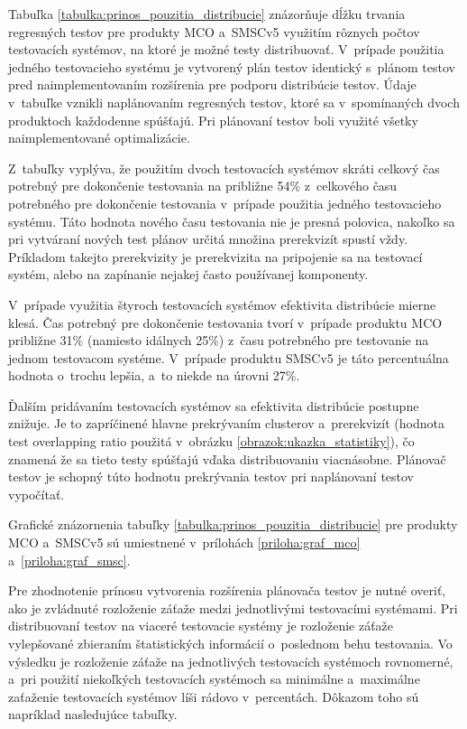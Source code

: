 Tabuľka \ref{tabulka:prinos_pouzitia_distribucie} znázorňuje dĺžku trvania 
regresných testov pre produkty MCO a~SMSCv5 využitím rôznych počtov 
testovacích systémov, na ktoré je možné testy distribuovať. 
V~prípade použitia jedného testovacieho systému
je vytvorený plán testov identický s~plánom testov pred naimplementovaním 
rozšírenia pre podporu distribúcie testov. 
Údaje v~tabuľke vznikli naplánovaním regresných testov, ktoré sa 
v~spomínaných dvoch produktoch každodenne spúšťajú.
Pri plánovaní testov boli využité všetky naimplementované optimalizácie.

Z~tabuľky vyplýva, že použitím dvoch testovacích systémov skráti celkový
čas potrebný pre dokončenie testovania na približne 54\% z~celkového času 
potrebného pre dokončenie testovania v~prípade použitia jedného 
testovacieho systému.
Táto hodnota nového času testovania nie je presná polovica, nakoľko sa pri
vytváraní nových test plánov určitá množina prerekvizít spustí vždy.
Príkladom takejto prerekvizity je prerekvizita na pripojenie sa na testovací
systém, alebo na zapínanie nejakej často používanej komponenty. 

V~prípade využitia štyroch testovacích systémov efektivita distribúcie 
mierne klesá. Čas potrebný pre dokončenie testovania tvorí 
v~prípade produktu MCO približne 31\% (namiesto idálnych 25\%) 
z~času potrebného pre testovanie na jednom testovacom systéme.
V~prípade produktu SMSCv5 je táto percentuálna hodnota o~trochu 
lepšia, a~to niekde na úrovni 27\%.

Ďalším pridávaním testovacích systémov sa efektivita distribúcie 
postupne znižuje. Je to zapríčinené hlavne prekrývaním clusterov 
a~prerekvizít (hodnota test overlapping ratio použitá v~obrázku 
\ref{obrazok:ukazka_statistiky}), čo znamená že sa tieto testy spúšťajú 
vďaka distribuovaniu viacnásobne. Plánovač testov je schopný túto 
hodnotu prekrývania testov pri naplánovaní testov vypočítať.

Grafické znázornenia tabuľky \ref{tabulka:prinos_pouzitia_distribucie}
pre produkty MCO a~SMSCv5 sú umiestnené v~prílohách 
\ref{priloha:graf_mco} a~\ref{priloha:graf_smsc}.

Pre zhodnotenie prínosu vytvorenia rozšírenia plánovača testov je nutné
overiť, ako je zvládnuté rozloženie záťaže medzi jednotlivými testovacími
systémami. Pri distribuovaní testov na viaceré testovacie systémy je 
rozloženie záťaže vylepšované zbieraním štatistických informácií o~poslednom
behu testovania. 
Vo výsledku je rozloženie záťaže na jednotlivých testovacích systémoch
rovnomerné, a~pri použití niekoľkých testovacích systémoch sa 
minimálne a~maximálne zaťaženie testovacích systémov líši rádovo v~percentách.
Dôkazom toho sú napríklad nasledujúce tabuľky. 

